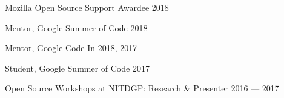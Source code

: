 Mozilla Open Source Support Awardee \hfill 2018

Mentor, Google Summer of Code \hfill 2018

Mentor, Google Code-In \hfill 2018, 2017

Student, Google Summer of Code \hfill 2017

Open Source Workshops at NITDGP: Research \& Presenter \hfill 2016 --- 2017
